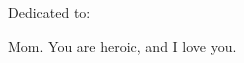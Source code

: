 %
%
\thispagestyle{empty}
{}

\vspace*{3cm}

%

\begin{center}
    Dedicated to:

\par
    Mom.  You are heroic, and I love you.

\end{center}
